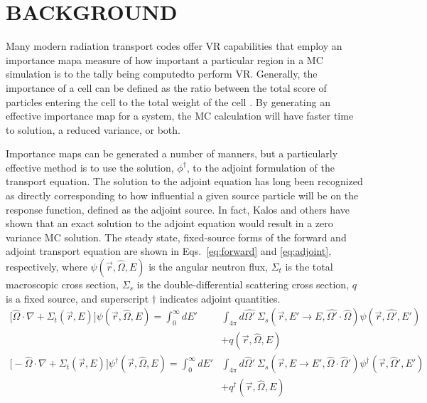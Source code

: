 \documentclass[12pt]{article}
\newcommand{\Macro}{\ensuremath{\Sigma}}
\newcommand{\vOmega}{\ensuremath{\hat{\Omega}}}
\newcommand{\rvec}{\ensuremath{\vec{r}}}
\begin{document}
%
\section{BACKGROUND}
\label{sect::second}

Many modern radiation transport codes offer VR capabilities that employ an importance map\textemdash a measure of how important a particular region in a MC simulation is to the tally being computed\textemdash to perform VR. Generally, the importance of a cell can be defined as the ratio between the total score of particles entering the cell to the total weight of the cell \cite{booth_automatic_1982}. By generating an effective importance map for a system, the MC calculation will have faster time to solution, a reduced variance, or both. 

Importance maps can be generated a number of manners, but a particularly effective method is to use the solution, $\phi^{\dagger}$, to the adjoint formulation of the transport equation. 
The solution to the adjoint equation has long been recognized as 
directly corresponding to how influential a given source particle will be on the response function, defined as the adjoint source.
In fact, Kalos \cite{kalos_importance_1963, goertzel_monte_1958} and others have shown that an exact solution to the adjoint equation would result in a zero variance MC solution. 
%
The steady state, fixed-source forms of the forward and adjoint transport equation are shown in Eqs.~\ref{eq:forward} and \ref{eq:adjoint}, respectively, where $\psi(\vec{r}, \hat{\Omega}, E)$ is the angular neutron flux, $\Sigma_t$ is the total macroscopic cross section, $\Sigma_s$ is the double-differential scattering cross section, $q$ is a fixed source, and superscript $\dagger$ indicates adjoint quantities.
%
\begin{subequations} 
\label{eq:transport}
\begin{align}
\bigl[\hat{\Omega} \cdot \nabla + \Macro_t(\vec{r}, E)\bigr] \psi(\vec{r}, \hat{\Omega}, E)  =  \int_0^{\infty} dE' &\int_{4\pi} d\hat{\Omega'} \:\Macro_{s}(\vec{r}, E' \to E, \hat{\Omega'} \cdot \hat{\Omega}) \psi(\vec{r}, \hat{\Omega'}, E')\nonumber \\
 &+ q(\vec{r}, \vOmega, E) \label{eq:forward} \\
%
\bigl[-\vOmega \cdot \nabla + \Sigma_t(\rvec, E)\bigr] \psi^{\dagger}(\vec{r}, \vOmega, E) = \int_0^{\infty} dE' &\int_{4\pi} d\vOmega' \: \Sigma_s(\rvec, E \rightarrow E', \vOmega \cdot \vOmega') \psi^{\dagger}(\rvec, \vOmega', E') \nonumber \\
&+ q^{\dagger}(\vec{r}, \vOmega, E) \label{eq:adjoint}
\end{align}
\end{subequations}
\end{document}
